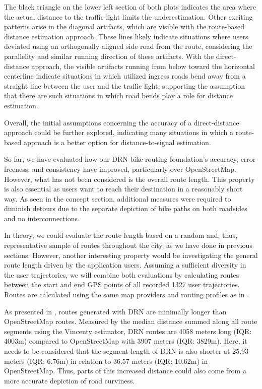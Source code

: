 The black triangle on the lower left section of both plots indicates the area where the actual distance to the traffic light limits the underestimation. Other exciting patterns arise in the diagonal artifacts, which are visible with the route-based distance estimation approach. These lines likely indicate situations where users deviated using an orthogonally aligned side road from the route, considering the parallelity and similar running direction of these artifacts. With the direct-distance approach, the visible artifacts running from below toward the horizontal centerline indicate situations in which utilized ingress roads bend away from a straight line between the user and the traffic light, supporting the assumption that there are such situations in which road bends play a role for distance estimation.

Overall, the initial assumptions concerning the accuracy of a direct-distance approach could be further explored, indicating many situations in which a route-based approach is a better option for distance-to-signal estimation.

So far, we have evaluated how our DRN bike routing foundation's accuracy, error-freeness, and consistency have improved, particularly over OpenStreetMap. However, what has not been considered is the overall route length. This property is also essential as users want to reach their destination in a reasonably short way. As seen in the concept section, additional measures were required to diminish detours due to the separate depiction of bike paths on both roadsides and no interconnections. 

In theory, we could evaluate the route length based on a random and, thus, representative sample of routes throughout the city, as we have done in previous sections. However, another interesting property would be investigating the general route length driven by the application users. Assuming a sufficient diversity in the user trajectories, we will combine both evaluations by calculating routes between the start and end GPS points of all recorded 1327 user trajectories. Routes are calculated using the same map providers and routing profiles as in .

As presented in , routes generated with DRN are minimally longer than OpenStreetMap routes. Measured by the median distance summed along all route segments using the Vincenty estimator, DRN routes are 4058 meters long (IQR: 4003m) compared to OpenStreetMap with 3907 meters (IQR: 3829m). Here, it needs to be considered that the segment length of DRN is also shorter at 25.93 meters (IQR: 6.76m) in relation to 36.57 meters (IQR: 10.62m) in OpenStreetMap. Thus, parts of this increased distance could also come from a more accurate depiction of road curviness. 


